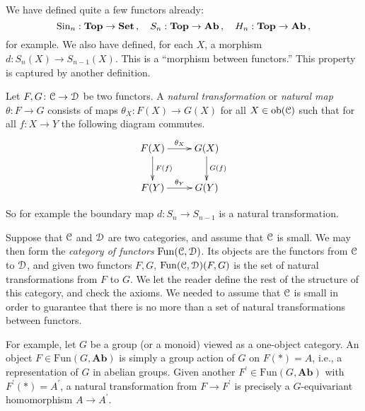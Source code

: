 We have defined quite a few functors already:
\[
\mathrm{Sin}_n:\mathbf{Top}\to\mathbf{Set}\,,\quad S_n:\mathbf{Top}\to\mathbf{Ab}\,,\quad H_n:\mathbf{Top}\to\mathbf{Ab}\,,
\]
for example. We also have defined, for each $X$, 
a morphism $d:S_n(X)\to S_{n-1}(X)$. This is a ``morphism between 
functors.'' This property is captured by another definition.
\begin{definition}
Let $F,G\colon \mathcal C\to\mathcal D$ be two functors.  A \emph{natural transformation} 
or \emph{natural map} $\theta\colon F\to G$ consists of maps $\theta_X\colon F(X)\to G(X)$ for all $X\in\mathrm{ob}(\mathcal C)$ such that for all $f\colon X\to Y$ the following diagram commutes. 
\begin{equation*}
\xymatrix{F(X)\ar[d]^{F(f)}\ar[r]^{\theta_X} & G(X)\ar[d]^{G(f)}\\
F(Y)\ar[r]^{\theta_Y} & G(Y)}
\end{equation*}
\end{definition}
So for example 
the boundary map $d\colon S_n\to S_{n-1}$ is a natural transformation.


\begin{example}
Suppose that $\mathcal C$ and $\mathcal D$ are two categories, and assume that $\mathcal C$ is
small. We may then form the {\em category of functors} $\mathrm{Fun}(\mathcal C,\mathcal D)$.
Its objects are the functors from $\mathcal C$ to $\mathcal D$, and given two functors
$F,G$, $\operatorname{Fun}(\mathcal C,\mathcal D)(F,G)$ is the set of natural transformations from $F$
to $G$. We let the reader define the rest of the structure of this category,
and check the axioms. We needed to assume that $\mathcal C$ is small in order to
guarantee that there is no more than a set of natural transformations between
functors.

For example, let $G$ be a group (or a monoid) viewed as a one-object category. An object $F\in\mathrm{Fun}(G,\mathbf{Ab})$ is simply a group action of $G$ on $F(\ast)=A$, i.e., a representation of $G$ in abelian groups. Given another $F^\prime\in\mathrm{Fun}(G,\mathbf{Ab})$ with $F^\prime(\ast)=A^\prime$, a natural transformation from $F\to F^\prime$ is precisely a $G$-equivariant homomorphism $A\to A^\prime$.
\end{example}

